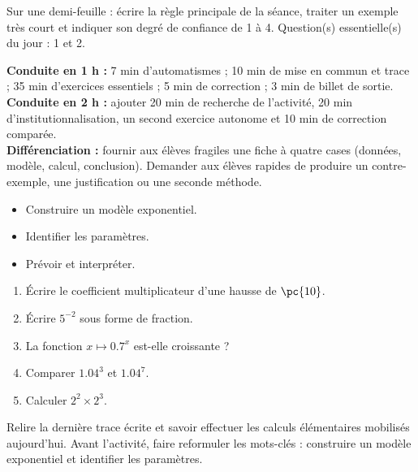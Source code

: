 \begin{exitticket}[3 minutes]Sur une demi-feuille : écrire la règle principale de la séance, traiter un exemple très court et indiquer son degré de confiance de 1 à 4. Question(s) essentielle(s) du jour : 1 et 2.\end{exitticket}

\ifmxteacher
\begin{method}
\textbf{Conduite en 1 h :} 7 min d'automatismes ; 10 min de mise en commun et trace ; 35 min d'exercices essentiels ; 5 min de correction ; 3 min de billet de sortie.\\
\textbf{Conduite en 2 h :} ajouter 20 min de recherche de l'activité, 20 min d'institutionnalisation, un second exercice autonome et 10 min de correction comparée.\\
\textbf{Différenciation :} fournir aux élèves fragiles une fiche à quatre cases (données, modèle, calcul, conclusion). Demander aux élèves rapides de produire un contre-exemple, une justification ou une seconde méthode.
\end{method}
\fi
{}
\begin{objectives}\begin{itemize}\item Construire un modèle exponentiel.\item Identifier les paramètres.\item Prévoir et interpréter.\end{itemize}\end{objectives}
\begin{fluency}\begin{enumerate}\item Écrire le coefficient multiplicateur d'une hausse de $\pc{10}$. \item Écrire $5^{-2}$ sous forme de fraction. \item La fonction $x\mapsto\num{0,7}^x$ est-elle croissante ? \item Comparer $\num{1,04}^3$ et $\num{1,04}^7$. \item Calculer $2^2\times2^3$. \end{enumerate}\end{fluency}
\begin{prerequisites}Relire la dernière trace écrite et savoir effectuer les calculs élémentaires mobilisés aujourd'hui. Avant l'activité, faire reformuler les mots-clés : construire un modèle exponentiel et identifier les paramètres.\end{prerequisites}

